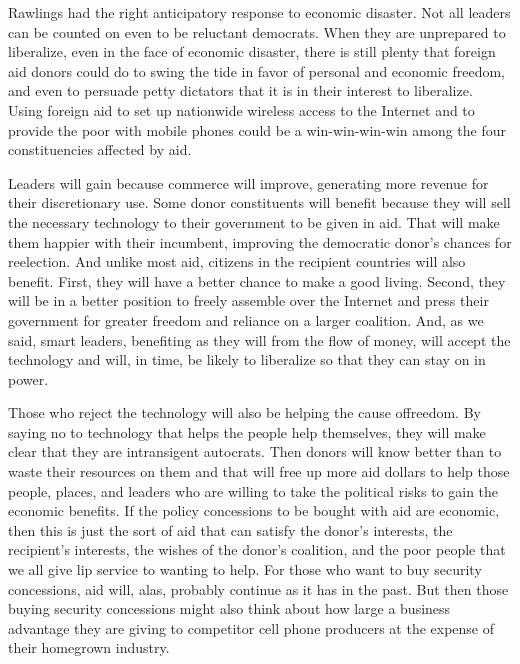 \documentclass[10pt]{article}
\begin{document}
{\large Rawlings had the right anticipatory response to economic disaster. Not
all leaders can be counted on even to be reluctant democrats. When they are
unprepared to liberalize, even in the face of economic disaster, there is still
plenty that foreign aid donors could do to swing the tide in favor of personal
and economic freedom, and even to persuade petty dictators that it is in their
interest to liberalize. Using foreign aid to set up nationwide wireless access to
the Internet and to provide the poor with mobile phones could be a
win-win-win-win among the four constituencies affected by aid.}

{\large Leaders will gain because commerce will improve, generating more revenue
for their discretionary use. Some donor constituents will benefit because they
will sell the necessary technology to their government to be given in aid. That
will make them happier with their incumbent, improving the democratic donor's
chances for reelection. And unlike most aid, citizens in the recipient countries
will also benefit. First, they will have a better chance to make a good living.
Second, they will be in a better position to freely assemble over the Internet
and press their government for greater freedom and reliance on a larger
coalition. And, as we said, smart leaders, benefiting as they will from the flow
of money, will accept the technology and will, in time, be likely to liberalize
so that they can stay on in power.}

{\large Those who reject the technology will also be helping the cause
offreedom. By saying no to technology that helps the people help themselves, they
will make clear that they are intransigent autocrats. Then donors will know
better than to waste their resources on them and that will free up more aid
dollars to help those people, places, and leaders who are willing to take the
political risks to gain the economic benefits. If the policy concessions to be
bought with aid are economic, then this is just the sort of aid that can satisfy
the donor's interests, the recipient's interests, the wishes of the donor's
coalition, and the poor people that we all give lip service to wanting to help.
For those who want to buy security concessions, aid will, alas, probably continue
as it has in the past. But then those buying security concessions might also
think about how large a business advantage they are giving to competitor cell
phone producers at the expense of their homegrown industry.}
\end{document}
